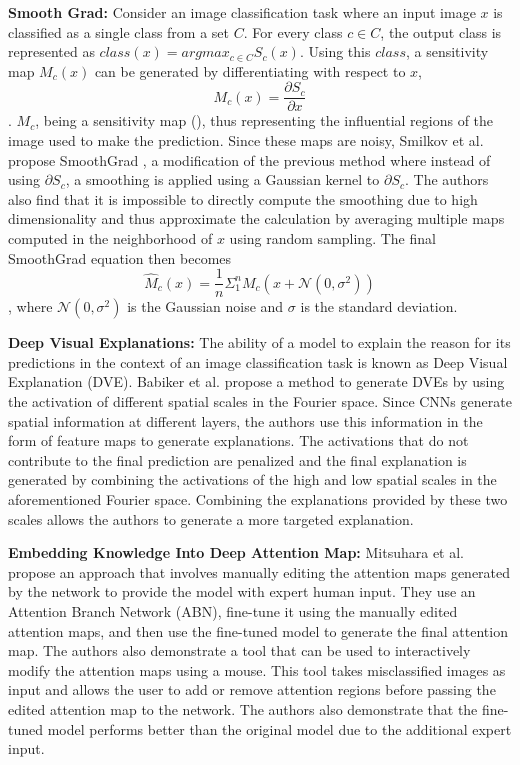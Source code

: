 \textbf{Smooth Grad: }
Consider an image classification task where an input image $x$ is classified as a single class from a set $C$. For every class $c \in C$, the output class is represented as $class(x) = argmax_{c \in C}S_{c}(x)$. Using this $class$, a sensitivity map $M_{c}(x)$ can be generated by differentiating with respect to $x$, $$M_{c}(x) = \frac{\partial S_{c}}{\partial x}$$ . $M_{c}$, being a sensitivity map (\cite{simonyanDeepConvolutionalNetworks2014}), thus representing the influential regions of the image used to make the prediction. Since these maps are noisy, Smilkov et al. propose SmoothGrad \cite{smilkovSmoothGradRemovingNoise2017}, a modification of the previous method where instead of using $\partial S_{c}$, a smoothing is applied using a Gaussian kernel to $\partial S_{c}$. The authors also find that it is impossible to directly compute the smoothing due to high dimensionality and thus approximate the calculation by averaging multiple maps computed in the neighborhood of $x$ using random sampling. The final SmoothGrad equation then becomes $$\hat M_{c}(x) = \frac{1}{n}\Sigma_{1}^{n}M_{c}(x + \mathcal{N}(0, \sigma^{2}))$$, where $\mathcal{N}(0, \sigma^{2})$ is the Gaussian noise and $\sigma$ is the standard deviation.

\textbf{Deep Visual Explanations: }
The ability of a model to explain the reason for its predictions in the context of an image classification task is known as Deep Visual Explanation (DVE). Babiker et al. \cite{babikerIntroductionDeepVisual2018} propose a method to generate DVEs by using the activation of different spatial scales in the Fourier space. Since CNNs generate spatial information at different layers, the authors use this information in the form of feature maps to generate explanations. The activations that do not contribute to the final prediction are penalized and the final explanation is generated by combining the activations of the high and low spatial scales in the aforementioned Fourier space. Combining the explanations provided by these two scales allows the authors to generate a more targeted explanation.

\textbf{Embedding Knowledge Into Deep Attention Map: }
Mitsuhara et al. \cite{mitsuharaEmbeddingHumanKnowledge2019} propose an approach that involves manually editing the attention maps generated by the network to provide the model with expert human input. They use an Attention Branch Network (ABN), fine-tune it using the manually edited attention maps, and then use the fine-tuned model to generate the final attention map. The authors also demonstrate a tool that can be used to interactively modify the attention maps using a mouse. This tool takes misclassified images as input and allows the user to add or remove attention regions before passing the edited attention map to the network. The authors also demonstrate that the fine-tuned model performs better than the original model due to the additional expert input.

